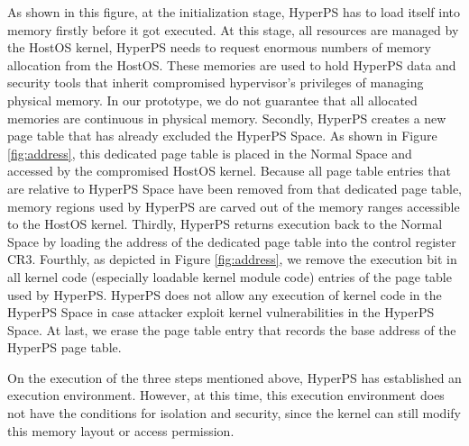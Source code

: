 As shown in this figure, at the initialization stage, HyperPS has to load itself into memory firstly before it got executed. 
At this stage, all resources are managed by the HostOS kernel, HyperPS needs to request enormous numbers of memory allocation from the HostOS. These memories are used to hold HyperPS data and security tools that inherit compromised hypervisor's privileges of managing physical memory. 
In our prototype, we do not guarantee that all allocated memories are continuous in physical memory. 
Secondly, HyperPS creates a new page table that has already excluded the HyperPS Space. As shown in Figure \ref{fig:address}, this dedicated page table is placed in the Normal Space and accessed by the compromised HostOS kernel. 
Because all page table entries that are relative to HyperPS Space have been removed from that dedicated page table, 
memory regions used by HyperPS are carved out of the memory ranges accessible to the HostOS kernel. 
Thirdly, HyperPS returns execution back to the Normal Space by loading the address of the dedicated page table into the control register CR3. 
Fourthly, as depicted in Figure \ref{fig:address}, we remove the execution bit in all kernel code (especially loadable kernel module code) entries of the page table used by HyperPS. 
HyperPS does not allow any execution of kernel code in the HyperPS Space in case attacker exploit kernel vulnerabilities in the HyperPS Space.
At last, we erase the page table entry that records the base address of the HyperPS page table.

On the execution of the three steps mentioned above, HyperPS has established an execution environment. 
However, at this time, this execution environment does not have the conditions for isolation and security, since the kernel can still modify this memory layout or access permission. 


